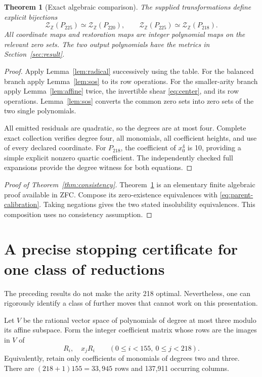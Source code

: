 \documentclass[10pt,letterpaper]{article}
\newtheorem{theorem}{Theorem}[section]
\theoremstyle{definition}\newtheorem{definition}[theorem]{Definition}
\newcommand{\Z}{\mathbb Z}\newcommand{\Q}{\mathbb Q}
\newcommand{\Zero}{\mathcal Z}
\begin{document}
\begin{theorem}[Exact algebraic comparison]\label{thm:bijection}
The supplied transformations define explicit bijections
\[
\Zero_{\Z}(P_{225})\simeq\Zero_{\Z}(P_{220}),\qquad
\Zero_{\Z}(P_{225})\simeq\Zero_{\Z}(P_{218}).
\]
All coordinate maps and restoration maps are integer polynomial maps on
the relevant zero sets. The two output polynomials have the metrics in
Section~\ref{sec:result}.
\end{theorem}
\begin{proof}
Apply Lemma~\ref{lem:radical} successively using the table. For the balanced
branch apply Lemma~\ref{lem:sos} to its row operations. For the smaller-arity
branch apply Lemma~\ref{lem:affine} twice, the invertible shear
\eqref{eq:center}, and its row operations. Lemma~\ref{lem:sos} converts the
common zero sets into zero sets of the two single polynomials.

All emitted residuals are quadratic, so the degrees are at most four.
Complete exact collection verifies degree four, all monomials, all
coefficient heights, and use of every declared coordinate. For $P_{218}$,
the coefficient of $x_0^4$ is 10, providing a simple explicit nonzero
quartic coefficient. The independently checked full expansions provide
the degree witness for both equations.
\end{proof}

\begin{proof}[Proof of Theorem~\ref{thm:consistency}]
Theorem~\ref{thm:bijection} is an elementary finite algebraic proof
available in ZFC. Compose its zero-existence equivalences with
\eqref{eq:parent-calibration}. Taking negations gives the two stated
insolubility equivalences. This composition uses no consistency assumption.
\end{proof}

\section{A precise stopping certificate for one class of reductions}
\label{sec:rank}

The preceding results do not make the arity 218 optimal. Nevertheless,
one can rigorously identify a class of further moves that cannot work
on this presentation.

Let $V$ be the rational vector space of polynomials of degree at most
three modulo its affine subspace. Form the integer coefficient matrix
whose rows are the images in $V$ of
\[
R_i,\quad x_jR_i
\qquad (0\le i<155,\ 0\le j<218).
\]
Equivalently, retain only coefficients of monomials of degrees two and
three. There are $(218+1)155=33,945$ rows and 137,911 occurring columns.
\end{document}
